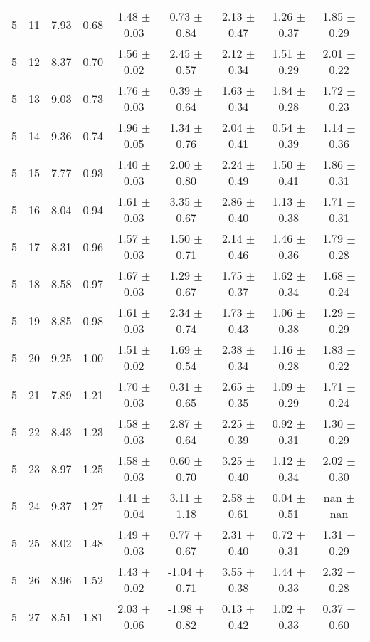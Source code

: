 \begin{landscape}
\begin{longtable}{ccccccccc}
   5 & 11 & 7.93 & 0.68 & 1.48 $\pm$ 0.03 & 0.73 $\pm$ 0.84 & 2.13 $\pm$ 0.47 & 1.26 $\pm$ 0.37 & 1.85 $\pm$ 0.29\\
   5 & 12 & 8.37 & 0.70 & 1.56 $\pm$ 0.02 & 2.45 $\pm$ 0.57 & 2.12 $\pm$ 0.34 & 1.51 $\pm$ 0.29 & 2.01 $\pm$ 0.22\\
   5 & 13 & 9.03 & 0.73 & 1.76 $\pm$ 0.03 & 0.39 $\pm$ 0.64 & 1.63 $\pm$ 0.34 & 1.84 $\pm$ 0.28 & 1.72 $\pm$ 0.23\\
   5 & 14 & 9.36 & 0.74 & 1.96 $\pm$ 0.05 & 1.34 $\pm$ 0.76 & 2.04 $\pm$ 0.41 & 0.54 $\pm$ 0.39 & 1.14 $\pm$ 0.36\\
   5 & 15 & 7.77 & 0.93 & 1.40 $\pm$ 0.03 & 2.00 $\pm$ 0.80 & 2.24 $\pm$ 0.49 & 1.50 $\pm$ 0.41 & 1.86 $\pm$ 0.31\\
   5 & 16 & 8.04 & 0.94 & 1.61 $\pm$ 0.03 & 3.35 $\pm$ 0.67 & 2.86 $\pm$ 0.40 & 1.13 $\pm$ 0.38 & 1.71 $\pm$ 0.31\\
   5 & 17 & 8.31 & 0.96 & 1.57 $\pm$ 0.03 & 1.50 $\pm$ 0.71 & 2.14 $\pm$ 0.46 & 1.46 $\pm$ 0.36 & 1.79 $\pm$ 0.28\\
   5 & 18 & 8.58 & 0.97 & 1.67 $\pm$ 0.03 & 1.29 $\pm$ 0.67 & 1.75 $\pm$ 0.37 & 1.62 $\pm$ 0.34 & 1.68 $\pm$ 0.24\\
   5 & 19 & 8.85 & 0.98 & 1.61 $\pm$ 0.03 & 2.34 $\pm$ 0.74 & 1.73 $\pm$ 0.43 & 1.06 $\pm$ 0.38 & 1.29 $\pm$ 0.29\\
   5 & 20 & 9.25 & 1.00 & 1.51 $\pm$ 0.02 & 1.69 $\pm$ 0.54 & 2.38 $\pm$ 0.34 & 1.16 $\pm$ 0.28 & 1.83 $\pm$ 0.22\\
   5 & 21 & 7.89 & 1.21 & 1.70 $\pm$ 0.03 & 0.31 $\pm$ 0.65 & 2.65 $\pm$ 0.35 & 1.09 $\pm$ 0.29 & 1.71 $\pm$ 0.24\\
   5 & 22 & 8.43 & 1.23 & 1.58 $\pm$ 0.03 & 2.87 $\pm$ 0.64 & 2.25 $\pm$ 0.39 & 0.92 $\pm$ 0.31 & 1.30 $\pm$ 0.29\\
   5 & 23 & 8.97 & 1.25 & 1.58 $\pm$ 0.03 & 0.60 $\pm$ 0.70 & 3.25 $\pm$ 0.40 & 1.12 $\pm$ 0.34 & 2.02 $\pm$ 0.30\\
   5 & 24 & 9.37 & 1.27 & 1.41 $\pm$ 0.04 & 3.11 $\pm$ 1.18 & 2.58 $\pm$ 0.61 & 0.04 $\pm$ 0.51 &  nan $\pm$  nan\\
   5 & 25 & 8.02 & 1.48 & 1.49 $\pm$ 0.03 & 0.77 $\pm$ 0.67 & 2.31 $\pm$ 0.40 & 0.72 $\pm$ 0.31 & 1.31 $\pm$ 0.29\\
   5 & 26 & 8.96 & 1.52 & 1.43 $\pm$ 0.02 & -1.04 $\pm$ 0.71 & 3.55 $\pm$ 0.38 & 1.44 $\pm$ 0.33 & 2.32 $\pm$ 0.28\\
   5 & 27 & 8.51 & 1.81 & 2.03 $\pm$ 0.06 & -1.98 $\pm$ 0.82 & 0.13 $\pm$ 0.42 & 1.02 $\pm$ 0.33 & 0.37 $\pm$ 0.60\\

\end{longtable}
\end{landscape}
